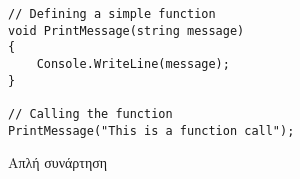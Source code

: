 \begin{listing}[htbp]
\begin{verbatim}
// Defining a simple function
void PrintMessage(string message)
{
    Console.WriteLine(message);
}

// Calling the function
PrintMessage("This is a function call");
\end{verbatim}
\caption{Απλή συνάρτηση}
\label{flagExec}
\end{listing}